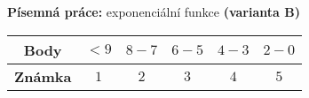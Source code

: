 \begin{center}
\large \textbf{Písemná práce:} exponenciální funkce \textbf{(varianta B)}

\normalsize
{}\qquad
{}\qquad
{}
\end{center}
\begin{table}[h]
\centering
\begin{tabular}{c|c|c|c|c|c}
    \textbf{Body}   & $< 9$ & $8-7$ & $6-5$ & $4-3$ & $2-0$ \\ \hline
    \textbf{Známka} & $1$     & $2$   & $3 $  & $4$   & $5$
\end{tabular}
\end{table}

\noindent
